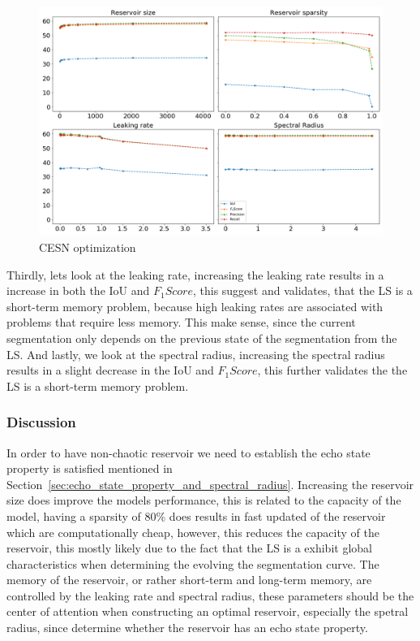 \documentclass{WitsPhysicsReport}
\begin{document}
\begin{figure}[H]
\centering
  \includegraphics[width=1\textwidth]{Figure/Results/reservoir_optim.png}
 \caption{CESN optimization}
 \label{fig:esn_optimization}
\end{figure}
Thirdly, lets look at the leaking rate, increasing the leaking rate results in a increase in both the IoU and $F_{1}Score$, this suggest and validates, that the LS is a short-term memory problem, because high leaking rates are associated with problems that require less memory. This make sense, since the current segmentation only depends on the previous state of the segmentation from the LS. 
And lastly, we look at the spectral radius, increasing the spectral radius results in a slight decrease in the IoU and $F_{1}Score$, this further validates the the LS is a short-term memory problem.

\subsubsection{Discussion}

In order to have non-chaotic reservoir we need to establish the echo state property is satisfied mentioned in Section~\ref{sec:echo_state_property_and_spectral_radius}. Increasing the reservoir size does improve the models performance, this is related to the capacity of the model, having a sparsity of 80\% does results in fast updated of the reservoir which are computationally cheap, however, this reduces the capacity of the reservoir, this mostly likely due to the fact that the LS is a exhibit global characteristics when determining the evolving the segmentation curve. The memory of the reservoir, or rather short-term and long-term memory, are controlled by the leaking rate and spectral radius, these parameters should be the center of attention when constructing an optimal reservoir, especially the spetral radius, since determine whether the reservoir has an echo state property.
\end{document}
